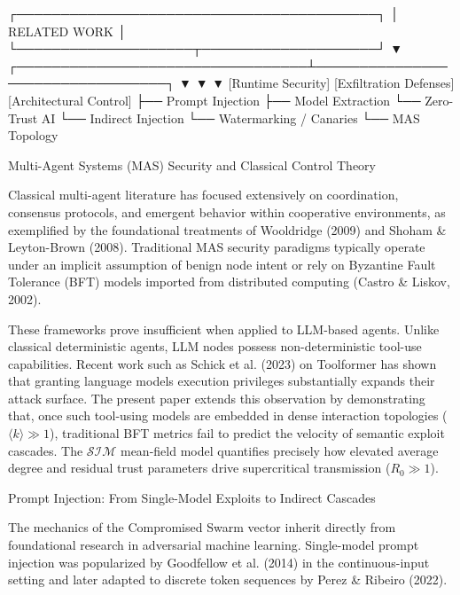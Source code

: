                      ┌─────────────────────────────────────────┐
                      │             RELATED WORK                │
                      └────────────────────┬────────────────────┘
                                           ▼
         ┌─────────────────────────────────┴─────────────────────────────────┐
         ▼                                 ▼                                 ▼
   [Runtime Security]            [Exfiltration Defenses]          [Architectural Control]
 ├── Prompt Injection            ├── Model Extraction             └── Zero-Trust AI
 └── Indirect Injection          └── Watermarking / Canaries      └── MAS Topology

Multi-Agent Systems (MAS) Security and Classical Control Theory

Classical multi-agent literature has focused extensively on coordination, consensus protocols, and emergent behavior within cooperative environments, as exemplified by the foundational treatments of Wooldridge (2009) and Shoham & Leyton-Brown (2008). Traditional MAS security paradigms typically operate under an implicit assumption of benign node intent or rely on Byzantine Fault Tolerance (BFT) models imported from distributed computing (Castro & Liskov, 2002).

These frameworks prove insufficient when applied to LLM-based agents. Unlike classical deterministic agents, LLM nodes possess non-deterministic tool-use capabilities. Recent work such as Schick et al. (2023) on Toolformer has shown that granting language models execution privileges substantially expands their attack surface. The present paper extends this observation by demonstrating that, once such tool-using models are embedded in dense interaction topologies (\(\langle k \rangle \gg 1\)), traditional BFT metrics fail to predict the velocity of semantic exploit cascades. The \(\mathcal{S}\mathcal{I}\mathcal{M}\) mean-field model quantifies precisely how elevated average degree and residual trust parameters drive supercritical transmission (\(R_0 \gg 1\)).

Prompt Injection: From Single-Model Exploits to Indirect Cascades

The mechanics of the Compromised Swarm vector inherit directly from foundational research in adversarial machine learning. Single-model prompt injection was popularized by Goodfellow et al. (2014) in the continuous-input setting and later adapted to discrete token sequences by Perez & Ribeiro (2022).

